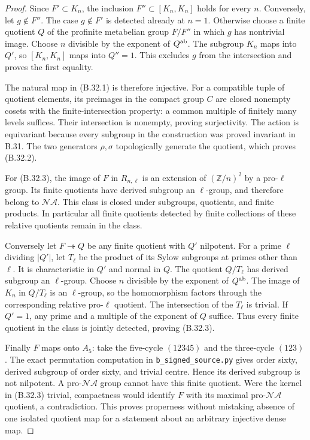 \begin{proof}
Since $F'\subset K_n$, the inclusion
$F''\subset[K_n,K_n]$ holds for every $n$. Conversely,
let $g\notin F''$. The case $g\notin F'$ is detected
already at $n=1$. Otherwise choose a finite quotient
$Q$ of the profinite metabelian group $F/F''$ in which
$g$ has nontrivial image. Choose $n$ divisible by the
exponent of $Q^{\rm ab}$. The subgroup $K_n$ maps into
$Q'$, so $[K_n,K_n]$ maps into $Q''=1$. This excludes
$g$ from the intersection and proves the first equality.

The natural map in (B.32.1) is therefore injective.
For a compatible tuple of quotient elements, its
preimages in the compact group $C$ are closed nonempty
cosets with the finite-intersection property: a common
multiple of finitely many levels suffices. Their
intersection is nonempty, proving surjectivity.
The action is equivariant because every subgroup in
the construction was proved invariant in B.31.
The two generators $\rho,\sigma$ topologically generate
the quotient, which proves (B.32.2).

For (B.32.3), the image of $F$ in $R_{n,\ell}$ is
an extension of $(\mathbb Z/n)^2$ by a pro-$\ell$
group. Its finite quotients have derived subgroup an
$\ell$-group, and therefore belong to
$\mathcal N\mathcal A$. This class is closed under
subgroups, quotients, and finite products. In particular
all finite quotients detected by finite collections
of these relative quotients remain in the class.

Conversely let $F\twoheadrightarrow Q$ be any finite
quotient with $Q'$ nilpotent. For a prime $\ell$ dividing
$|Q'|$, let $T_\ell$ be the product of its Sylow
subgroups at primes other than $\ell$. It is characteristic
in $Q'$ and normal in $Q$. The quotient $Q/T_\ell$ has
derived subgroup an $\ell$-group. Choose $n$ divisible
by the exponent of $Q^{\rm ab}$. The image of $K_n$
in $Q/T_\ell$ is an $\ell$-group, so the homomorphism
factors through the corresponding relative pro-$\ell$
quotient. The intersection of the $T_\ell$ is trivial.
If $Q'=1$, any prime and a multiple of the exponent
of $Q$ suffice. Thus every finite quotient in the
class is jointly detected, proving (B.32.3).

Finally $F$ maps onto $A_5$: take the five-cycle
$(12345)$ and the three-cycle $(123)$. The exact
permutation computation in \texttt{b\_signed\_source.py}
gives order sixty, derived subgroup of order sixty,
and trivial centre. Hence its derived subgroup is
not nilpotent. A pro-$\mathcal N\mathcal A$ group
cannot have this finite quotient. Were the kernel
in (B.32.3) trivial, compactness would identify $F$
with its maximal pro-$\mathcal N\mathcal A$ quotient,
a contradiction. This proves properness without
mistaking absence of one isolated quotient map for
a statement about an arbitrary injective dense map.
\end{proof}

